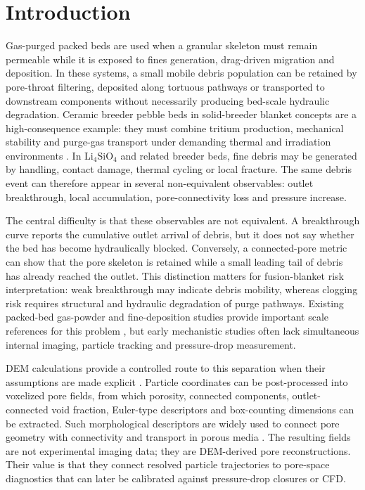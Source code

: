 \documentclass[preprint,12pt,authoryear]{elsarticle}
\newcommand{\LiSi}{Li$_4$SiO$_4$\xspace}
\begin{document}
\section{Introduction}

Gas-purged packed beds are used when a granular skeleton must remain permeable while it is exposed to fines generation, drag-driven migration and deposition. In these systems, a small mobile debris population can be retained by pore-throat filtering, deposited along tortuous pathways or transported to downstream components without necessarily producing bed-scale hydraulic degradation. Ceramic breeder pebble beds in solid-breeder blanket concepts are a high-consequence example: they must combine tritium production, mechanical stability and purge-gas transport under demanding thermal and irradiation environments \citep{Abdou2015Blanket,Giancarli2012HCPB}. In \LiSi and related breeder beds, fine debris may be generated by handling, contact damage, thermal cycling or local fracture. The same debris event can therefore appear in several non-equivalent observables: outlet breakthrough, local accumulation, pore-connectivity loss and pressure increase.

The central difficulty is that these observables are not equivalent. A breakthrough curve reports the cumulative outlet arrival of debris, but it does not say whether the bed has become hydraulically blocked. Conversely, a connected-pore metric can show that the pore skeleton is retained while a small leading tail of debris has already reached the outlet. This distinction matters for fusion-blanket risk interpretation: weak breakthrough may indicate debris mobility, whereas clogging risk requires structural and hydraulic degradation of purge pathways. Existing packed-bed gas-powder and fine-deposition studies provide important scale references for this problem \citep{Natsui2012FinesClogging,Boccardo2019PackedBedDeposition,Wang2024IJMF}, but early mechanistic studies often lack simultaneous internal imaging, particle tracking and pressure-drop measurement.

DEM calculations provide a controlled route to this separation when their assumptions are made explicit \citep{Cundall1979DEM,Kloss2012LIGGGHTS,Plimpton1995LAMMPS}. Particle coordinates can be post-processed into voxelized pore fields, from which porosity, connected components, outlet-connected void fraction, Euler-type descriptors and box-counting dimensions can be extracted. Such morphological descriptors are widely used to connect pore geometry with connectivity and transport in porous media \citep{Armstrong2019Minkowski,Dathe2005Fractal}. The resulting fields are not experimental imaging data; they are DEM-derived pore reconstructions. Their value is that they connect resolved particle trajectories to pore-space diagnostics that can later be calibrated against pressure-drop closures or CFD.
\end{document}
